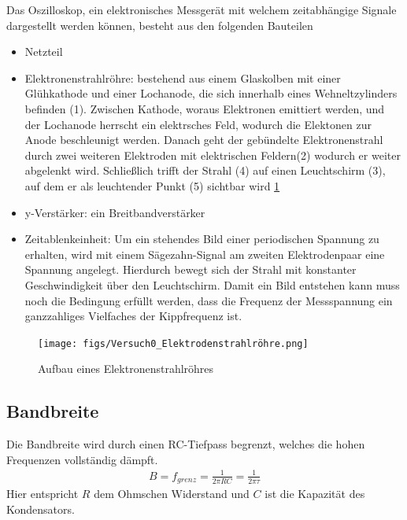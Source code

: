 \documentclass{article}
\begin{document}
Das Oszilloskop, ein elektronisches Messgerät mit welchem zeitabhängige Signale dargestellt werden können, besteht aus den folgenden Bauteilen
\begin{itemize}
    \item Netzteil
    \item Elektronenstrahlröhre: bestehend aus einem Glaskolben mit einer Glühkathode und einer Lochanode,
     die sich innerhalb eines Wehneltzylinders befinden (1). Zwischen Kathode, woraus Elektronen emittiert
      werden, und der Lochanode herrscht ein elektrsches Feld, wodurch die Elektonen zur Anode beschleunigt 
      werden. Danach geht der gebündelte Elektronenstrahl durch zwei weiteren Elektroden mit elektrischen 
      Feldern(2) wodurch er weiter abgelenkt wird. Schließlich trifft der Strahl (4) auf einen Leuchtschirm
       (3), auf dem er als leuchtender Punkt (5) sichtbar wird \ref{fig:elektronenstrahlröhre} \\
    
    \item y-Verstärker: ein Breitbandverstärker
    
    \item Zeitablenkeinheit: Um ein stehendes Bild einer periodischen Spannung zu erhalten, wird mit einem Sägezahn-Signal am zweiten Elektrodenpaar eine Spannung angelegt. Hierdurch bewegt sich der Strahl mit konstanter Geschwindigkeit über den Leuchtschirm. Damit ein Bild entstehen kann muss noch die Bedingung erfüllt werden, dass die Frequenz der Messspannung ein ganzzahliges Vielfaches der Kippfrequenz ist.

    
\end{itemize}
\begin{figure}[H]
    \centering
    \texttt{[image: figs/Versuch0\_Elektrodenstrahlröhre.png]}
    \caption{Aufbau eines Elektronenstrahlröhres \cite{anleitung}}
    \label{fig:elektronenstrahlröhre}
\end{figure}

\subsection*{Bandbreite}
Die Bandbreite wird durch einen RC-Tiefpass begrenzt, welches die hohen Frequenzen vollständig dämpft.
\begin{align}
  B = f_{grenz}= \frac{1}{2\pi RC}=  \frac{1}{2\pi \tau}
\end{align}
Hier entspricht $R$ dem Ohmschen Widerstand und $C$ ist die Kapazität des Kondensators. 
\end{document}
